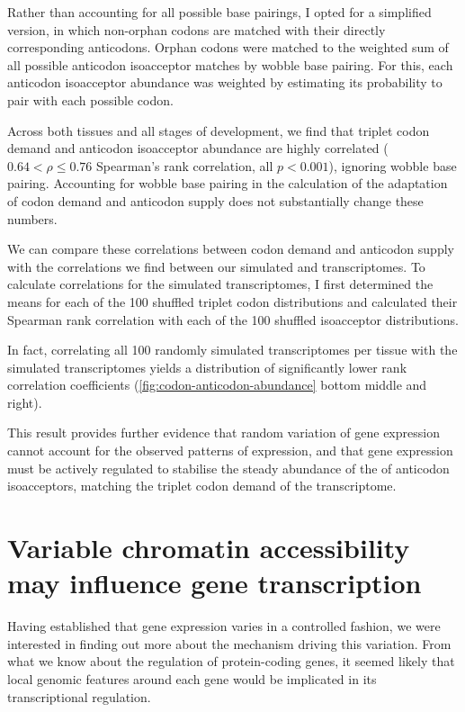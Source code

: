Rather than accounting for all possible base pairings, I opted for a simplified
version, in which non-orphan codons are matched with their directly
corresponding anticodons. Orphan codons were matched to the weighted sum of all
possible \trna anticodon isoacceptor matches by wobble base pairing. For this,
each anticodon isoacceptor abundance was weighted by estimating its probability
to pair with each possible codon.

Across both tissues and all stages of development, we find that \mrna triplet
codon demand and \trna anticodon isoacceptor abundance are highly correlated
(\(0.64 < \rho \leq 0.76\) Spearman’s rank correlation, all \(p < 0.001\)),
ignoring wobble base pairing. Accounting for wobble base pairing in the
calculation of the adaptation of codon demand and anticodon supply does not
substantially change these numbers.

We can compare these correlations between \mrna codon demand and \trna anticodon
supply with the correlations we find between our simulated \mrna and \trna
transcriptomes. To calculate correlations for the simulated transcriptomes, I
first determined the means for each of the \num{100} shuffled triplet codon
distributions and calculated their Spearman rank correlation with each of the
\num{100} shuffled isoacceptor distributions.

In fact, correlating all \num{100} randomly simulated \trna
transcriptomes per tissue with the simulated \mrna transcriptomes yields a
distribution of significantly lower rank correlation coefficients
(\cref{fig:codon-anticodon-abundance} bottom middle and right).

This result provides further evidence that random variation of \trna gene
expression cannot account for the observed patterns of expression, and that
\trna gene expression must be actively regulated to stabilise the steady
abundance of the of \trna anticodon isoacceptors, matching the triplet codon
demand of the \mrna transcriptome.

\section{Variable chromatin accessibility may influence \trna gene transcription}

Having established that \trna gene expression varies in a controlled fashion, we
were interested in finding out more about the mechanism driving this variation.
From what we know about the regulation of protein-coding genes, it seemed likely
that local genomic features around each \trna gene would be implicated in its
transcriptional regulation.

